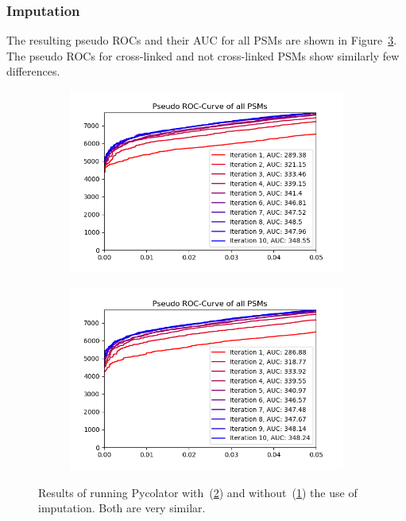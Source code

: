 \subsubsection{Imputation}
\label{lab:results:imputation}
The resulting pseudo ROCs and their AUC for all PSMs are shown in Figure~\ref{fig:results:imputation}. The pseudo ROCs for cross-linked and not cross-linked PSMs show similarly few differences.
\renewcommand{\baselinestretch}{0.9}
\begin{figure}
	\normalsize
	\centering
	\begin{subfigure}{0.49 \textwidth}
		\includegraphics[width = \textwidth]{figures/no_imputation.png}
		\caption{}
		\label{fig:results:imputation_no}
	\end{subfigure}
	\hfill
	\begin{subfigure}{0.49 \textwidth}
		\includegraphics[width = \textwidth]{figures/imputation.png}
		\caption{}
		\label{fig:results:imputation_yes}
	\end{subfigure}
	\caption[Results of imputation]{Results of running Pycolator with~(\ref{fig:results:imputation_yes}) and without~(\ref{fig:results:imputation_no}) the use of imputation. Both are very similar.}
	\label{fig:results:imputation}
\end{figure}
\renewcommand{\baselinestretch}{1}

